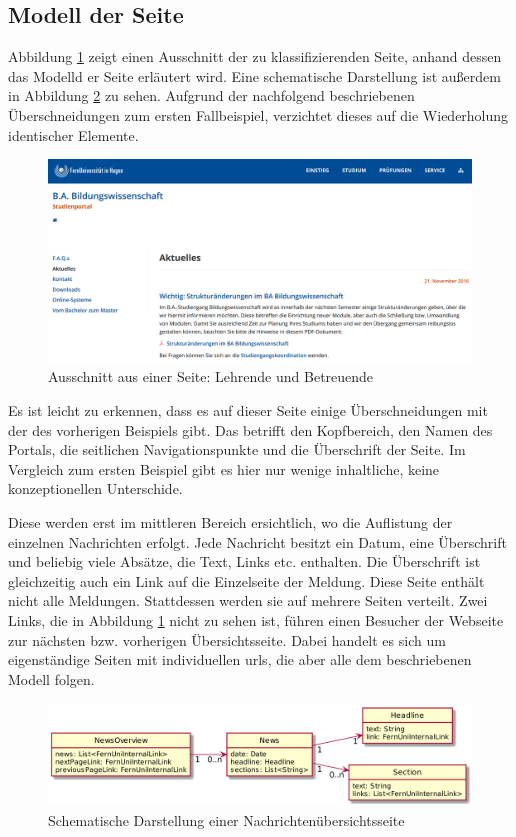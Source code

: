 \subsection{Modell der Seite}
    Abbildung \ref{image:findingNewsModelOverview} zeigt einen
    Ausschnitt der zu klassifizierenden Seite,
    anhand dessen das Modelld er Seite erläutert wird.
    Eine schematische Darstellung ist außerdem in Abbildung
    \ref{image:findingNewsModelUml} zu sehen.
    Aufgrund der nachfolgend beschriebenen Überschneidungen zum
    ersten Fallbeispiel, verzichtet dieses auf die Wiederholung
    identischer Elemente.

    \begin{figure}[htb]
        \centering
        \includegraphics[scale=\imageScalingFactor]{../resources/findings/case-study-2/news-overview.png}
        \caption{Ausschnitt aus einer Seite: Lehrende und Betreuende}
        \label{image:findingNewsModelOverview}
    \end{figure}

    Es ist leicht zu erkennen, dass es auf dieser Seite einige Überschneidungen
    mit der des vorherigen Beispiels gibt.
    Das betrifft den Kopfbereich, den Namen des Portals,
    die seitlichen Navigationspunkte und die Überschrift der Seite.
    Im Vergleich zum ersten Beispiel gibt es hier nur wenige inhaltliche,
    keine konzeptionellen Unterschide.

    Diese werden erst im mittleren Bereich ersichtlich,
    wo die Auflistung der einzelnen Nachrichten erfolgt.
    Jede Nachricht besitzt ein Datum, eine Überschrift und beliebig viele Absätze,
    die Text, Links etc. enthalten.
    Die Überschrift ist gleichzeitig auch ein Link auf die Einzelseite der Meldung.
    Diese Seite enthält nicht alle Meldungen.
    Stattdessen werden sie auf mehrere Seiten verteilt.
    Zwei Links, die in Abbildung \ref{image:findingNewsModelOverview} nicht zu sehen ist,
    führen einen Besucher der Webseite zur nächsten bzw. vorherigen Übersichtsseite.
    Dabei handelt es sich um eigenständige Seiten mit individuellen \glspl{url},
    die aber alle dem beschriebenen Modell folgen.

    \begin{figure}[htb]
        \centering
        \includegraphics[scale=\imageScalingFactor]{../resources/findings/case-study-2/model.png}
        \caption{Schematische Darstellung einer Nachrichtenübersichtsseite}
        \label{image:findingNewsModelUml}
    \end{figure}